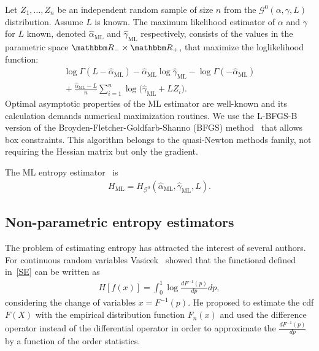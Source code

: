\documentclass[journal]{IEEEtran}
\begin{document}
Let $Z_1,\dots, Z_n$ be an independent random sample of size $n$ from the $\mathcal G^0(\alpha,\gamma,L)$ distribution.
Assume $L$ is known.
The maximum likelihood estimator of $\alpha$ and $\gamma$ for $L$ known, denoted $\widehat\alpha_{\text{ML}}$ and $\widehat\gamma_{\text{ML}}$ respectively, consists of the values in the parametric space $\mathbbm R_-\times\mathbbm R_+$, that maximize the loglikelihood function:
\begin{multline}
	\log \Gamma(L-\widehat\alpha_{\text{ML}})-
	\widehat\alpha_{\text{ML}}\log \widehat\gamma_{\text{ML}} -\log\Gamma(-\widehat\alpha_{\text{ML}})  \\
	\mbox{}+\frac{\widehat\alpha_{\text{ML}}-L}{n} \sum_{i=1}^n\log\big(\widehat\gamma_{\text{ML}}+L Z_i\big).
	\label{ML}
\end{multline}
Optimal asymptotic properties of the ML estimator are well-known and its calculation demands numerical maximization routines.
We use the L-BFGS-B version of the Broyden-Fletcher-Goldfarb-Shanno (BFGS) method~\cite{Luenberger2008} that allows box constraints.
This algorithm belongs to the quasi-Newton methods family, not requiring the Hessian matrix but only the gradient.

The ML entropy estimator~\cite{CaseBerg01} is
\begin{align}
	H_\text{ML}=H_{\mathcal G^0}(\widehat{\alpha}_{\text{ML}},\widehat{\gamma}_{\text{ML}},L).
\end{align}




\subsection{Non-parametric entropy estimators}
\label{Hest}

The problem of estimating entropy has attracted the interest of several authors. For continuous random variables Vasicek~\cite{Vasicek76} showed that the functional defined in~\eqref{SE} can be written as
\begin{align}
	H[f(x)]=\int_{0}^{1} \log \frac{d F^{-1}(p)}{d p} d p,
\end{align}
considering the change of variables $x=F^{-1}(p).$
He proposed to estimate the cdf $F(X)$ with the empirical distribution function $F_n(x)$ and used the difference operator instead of the differential operator in order to approximate the $\frac{d F^{-1}(p)}{d p}$ by a function of the order statistics.
\end{document}
